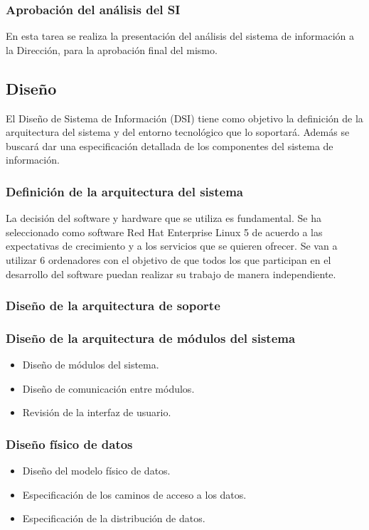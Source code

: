 \documentclass[11pt,a4paper,spanish,twoside]{book}
\begin{document}
\subsubsection{Aprobación del análisis del SI}
En esta tarea se realiza la presentación del análisis del sistema de
información a la Dirección, para la aprobación final del mismo.


\subsection{Diseño}
El Diseño de Sistema de Información (DSI) tiene como objetivo la definición
de la arquitectura del sistema y del entorno tecnológico que lo
soportará. Además se buscará dar una especificación detallada de los
componentes del sistema de información.

\subsubsection{Definición de la arquitectura del sistema}
La decisión del software y hardware que se utiliza es fundamental. Se ha
seleccionado como software Red Hat Enterprise Linux 5 de acuerdo a las
expectativas de crecimiento y a los servicios que se quieren ofrecer. Se
van a utilizar 6 ordenadores con el objetivo de que todos los que participan
en el desarrollo del software puedan realizar su trabajo de manera
independiente. 
 
\subsubsection{Diseño de la arquitectura de soporte}

\subsubsection{Diseño de la arquitectura de módulos del sistema}
    \begin{itemize}
    \item Diseño de módulos del sistema.
    \item Diseño de comunicación entre módulos.
    \item Revisión de la interfaz de usuario.
    \end{itemize}
\subsubsection{Diseño físico de datos}
    \begin{itemize}
    \item Diseño del modelo físico de datos.
    \item Especificación de los caminos de acceso a los datos.
    \item Especificación de la distribución de datos.
    \end{itemize}
\end{document}
